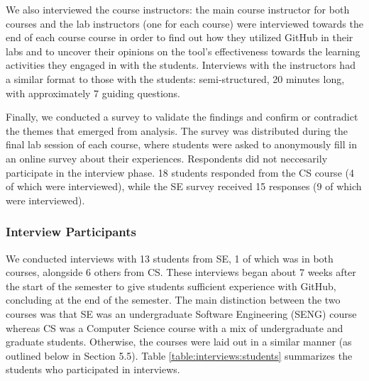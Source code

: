 We also interviewed the course instructors: the main course instructor for both courses and the lab instructors (one for each course) were interviewed towards the end of each course course in order to find out how they utilized GitHub in their labs and to uncover their opinions on the tool's effectiveness towards the learning activities they engaged in with the students. Interviews with the instructors had a similar format to those with the students: semi-structured, 20 minutes long, with approximately 7 guiding questions.

Finally, we conducted a survey to validate the findings and confirm or contradict the themes that emerged from analysis. The survey was distributed during the final lab session of each course, where students were asked to anonymously fill in an online survey about their experiences. Respondents did not neccesarily participate in the interview phase. 18 students responded from the CS course (4 of which were interviewed), while the SE survey received 15 responses (9 of which were interviewed).

\subsubsection{Interview Participants}
We conducted interviews with 13 students from SE, 1 of which was in both courses, alongside 6 others from CS. These interviews began about 7 weeks after the start of the semester to give students sufficient experience with GitHub, concluding at the end of the semester. The main distinction between the two courses was that SE was an undergraduate Software Engineering (SENG) course whereas CS was a Computer Science course with a mix of undergraduate and graduate students. Otherwise, the courses were laid out in a similar manner (as outlined below in Section 5.5). Table \ref{table:interviews:students} summarizes the students who participated in interviews.

